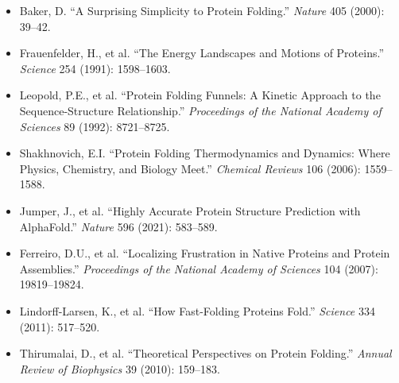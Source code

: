 \documentclass[a4paper, 11pt]{article}
\begin{document}
\begin{itemize}
\item Baker, D. ``A Surprising Simplicity to Protein Folding.'' \textit{Nature} 405 (2000):
39--42.

\item Frauenfelder, H., et al. ``The Energy Landscapes and Motions of Proteins.''
\textit{Science} 254 (1991): 1598--1603.

\item Leopold, P.E., et al. ``Protein Folding Funnels: A Kinetic Approach to the
Sequence-Structure Relationship.'' \textit{Proceedings of the National Academy of Sciences}
89 (1992): 8721--8725.

\item Shakhnovich, E.I. ``Protein Folding Thermodynamics and Dynamics: Where Physics,
Chemistry, and Biology Meet.'' \textit{Chemical Reviews} 106 (2006): 1559--1588.

\item Jumper, J., et al. ``Highly Accurate Protein Structure Prediction with AlphaFold.''
\textit{Nature} 596 (2021): 583--589.

\item Ferreiro, D.U., et al. ``Localizing Frustration in Native Proteins and Protein
Assemblies.'' \textit{Proceedings of the National Academy of Sciences} 104 (2007): 19819--19824.

\item Lindorff-Larsen, K., et al. ``How Fast-Folding Proteins Fold.'' \textit{Science} 334
(2011): 517--520.

\item Thirumalai, D., et al. ``Theoretical Perspectives on Protein Folding.'' \textit{Annual
Review of Biophysics} 39 (2010): 159--183.
\end{itemize}
\end{document}
